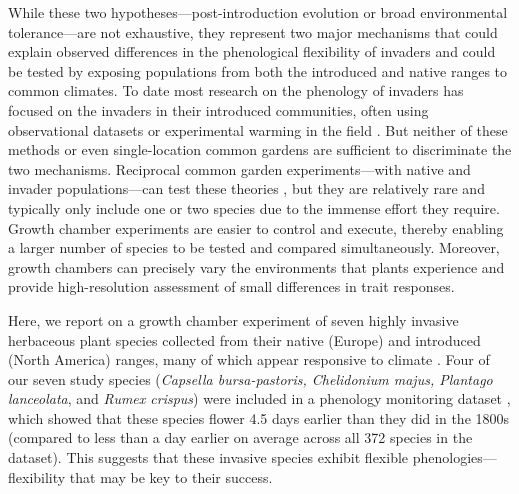 \documentclass[11pt]{article}\usepackage[]{graphicx}\usepackage[]{color}
\begin{document}
While these two hypotheses---post-introduction evolution or broad environmental tolerance---are not exhaustive, they represent two major mechanisms that could explain observed differences in the phenological flexibility of invaders \parencite{Wolkovich2014,Reeb2020,Zettlemoyer2019} and could be tested by exposing populations from both the introduced and native ranges to common climates. To date most research on the phenology of invaders has focused on the invaders in their introduced communities, often using observational datasets \parencite[e.g.,][]{Wolkovich2013} or experimental warming in the field \parencite[e.g.,][]{Zettlemoyer2019}. But neither of these methods or even single-location common gardens \parencite[i.e., testing individuals from only one part of the range or in only one site,][]{Conner2004,Vitasse2009} are sufficient to discriminate the two mechanisms. Reciprocal common garden experiments---with native and invader populations---can test these theories \parencite[e.g.,][]{Williams2008,Lamarque2015}, but they are relatively rare and typically only include one or two species due to the immense effort they require. Growth chamber experiments are easier to control and execute, thereby enabling a larger number of species to be tested and compared simultaneously. Moreover, growth chambers can precisely vary the environments that plants experience and provide high-resolution assessment of small differences in trait responses. 

Here, we report on a growth chamber experiment of seven highly invasive herbaceous plant species collected from their native (Europe) and introduced (North America) ranges, many of which appear responsive to climate \parencite{Wolkovich2014}. Four of our seven study species (\textit{Capsella bursa-pastoris, Chelidonium majus, Plantago lanceolata}, and \textit{Rumex crispus}) were included in a phenology monitoring dataset \parencite[the Concord Phenology Dataset,][]{Willis:2008bf}, which showed that these species flower 4.5 days earlier than they did in the 1800s (compared to less than a day earlier on average across all 372 species in the dataset). This suggests that these invasive species exhibit flexible phenologies---flexibility that may be key to their success. %
\end{document}
